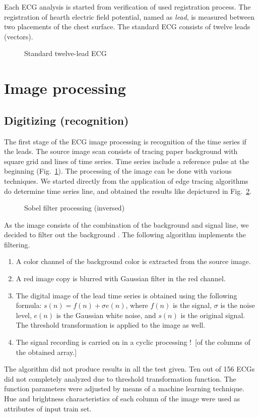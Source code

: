 \documentclass[runningheads]{AIIT}
\newcommand{\nnn}[2][ncolor]{\noindent%
\textcolor{eclr}{!\ [}\textcolor{#1}{#2}\textcolor{eclr}{]}}
\begin{document}
Each ECG analysis is started from verification of used registration process.  The registration of hearth electric field potential, named as \emph{lead}, is measured between two placements of the chest surface.  The standard ECG consists of twelve leads (vectors).

\begin{figure}[htb]
  \centering

  \caption{Standard twelve-lead ECG}
  \label{fig:leads-ex}
\end{figure}

\section{Image processing}
\label{sec:image-processing}

\subsection{Digitizing (recognition)}
\label{sec:digit-recogn}

The first stage of the ECG image processing is recognition of the time series if the leads.  The source image scan consists of tracing paper background with square grid and lines of time series.  Time series include a reference pulse at the beginning (Fig.~\ref{fig:leads-ex}).  The processing of the image can be done with various techniques.  We started directly from the application of edge tracing algorithms do determine time series line, and obtained the results like depictured in Fig.~\ref{fig:sobel-ex}.

\begin{figure}[htb]
  \centering

  \caption{Sobel filter processing (inversed)}
  \label{fig:sobel-ex}
\end{figure}

As the image consists of the combination of the background and signal line, we decided to filter out the background \cite{1}.  The following algorithm implements the filtering.
\begin{enumerate}
\item A color channel of the background color is extracted from the source image.
\item A red image copy is blurred with Gaussian filter in the red channel.
\item The digital image of the lead time series is obtained using the following formula:
  $s(n)=f(n)+\sigma e(n)$, where $f(n)$ is the signal, $\sigma$ is the
  noise level, $e(n)$ is the Gaussian white noise, and $s(n)$ is the original
  signal.  The threshold transformation is applied to the image as well.
\item The signal recording is carried on in a cyclic processing \nnn{of the columns of the obtained array.}
\end{enumerate}
The algorithm did not produce results in all the test given.  Ten out of 156 ECGs did not completely analyzed due to threshold transformation function.  The function parameters were adjusted by means of a machine learning technique.  Hue and brightness characteristics of each column of the image were used as attributes of input train set.
\end{document}
